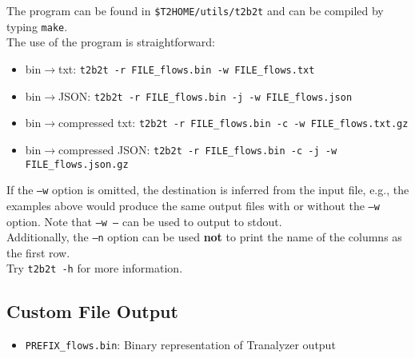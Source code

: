 \documentclass[documentation]{subfiles}
\begin{document}
The program can be found in {\tt\$T2HOME/utils/t2b2t} and can be compiled by typing {\tt make}.\\

The use of the program is straightforward:
\begin{itemize}
    \item bin$\rightarrow$txt: {\tt t2b2t -r FILE\_flows.bin -w FILE\_flows.txt}
    \item bin$\rightarrow$JSON: {\tt t2b2t -r FILE\_flows.bin -j -w FILE\_flows.json}
    \item bin$\rightarrow$compressed txt: {\tt t2b2t -r FILE\_flows.bin -c -w FILE\_flows.txt.gz}
    \item bin$\rightarrow$compressed JSON: {\tt t2b2t -r FILE\_flows.bin -c -j -w FILE\_flows.json.gz}
\end{itemize}

If the {\tt --w} option is omitted, the destination is inferred from the input file, e.g., the examples above would produce the same output files with or without the {\tt --w} option. Note that {\tt --w --} can be used to output to stdout.\\
Additionally, the {\tt --n} option can be used {\bf not} to print the name of the columns as the first row.\\
Try {\tt t2b2t -h} for more information.

\subsection{Custom File Output}
\begin{itemize}
    \item {\tt PREFIX\_flows.bin}: Binary representation of Tranalyzer output
\end{itemize}
\end{document}
